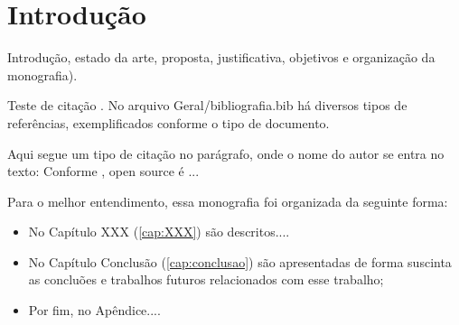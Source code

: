 \chapter{Introdução}
\label{cap:introducao}

Introdução, estado da arte, proposta, justificativa, objetivos e organização da
monografia).

Teste de citação \cite{Weka2014}. No arquivo Geral/bibliografia.bib há diversos tipos de referências,
exemplificados conforme o tipo de documento.

Aqui segue um tipo de citação no parágrafo, onde o nome do autor se entra no texto: Conforme
, open source é ...


Para o melhor entendimento, essa monografia foi organizada da seguinte forma:

\begin{itemize}
\item No Capítulo XXX (\ref{cap:XXX}) são descritos....

\item No Capítulo Conclusão (\ref{cap:conclusao}) são apresentadas de forma suscinta as concluões e trabalhos futuros relacionados com esse trabalho;

\item Por fim, no Apêndice....
\end{itemize}

